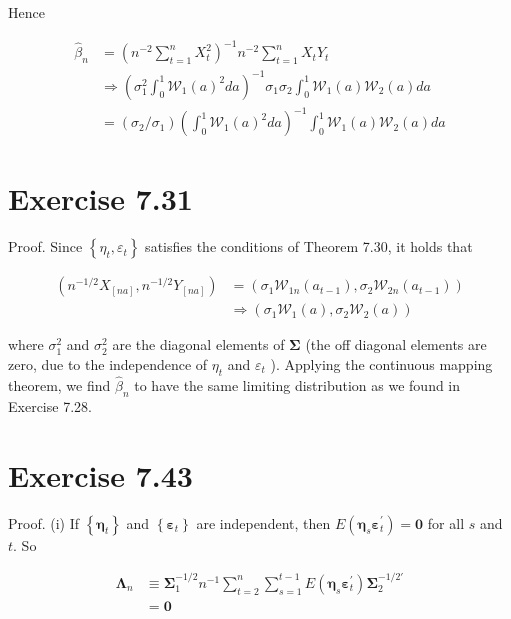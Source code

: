 \documentclass[10pt]{article}
\begin{document}
Hence

$$
\begin{aligned}
\hat{\beta}_{n} & =\left(n^{-2} \sum_{t=1}^{n} X_{t}^{2}\right)^{-1} n^{-2} \sum_{t=1}^{n} X_{t} Y_{t} \\
& \Rightarrow\left(\sigma_{1}^{2} \int_{0}^{1} \mathcal{W}_{1}(a)^{2} d a\right)^{-1} \sigma_{1} \sigma_{2} \int_{0}^{1} \mathcal{W}_{1}(a) \mathcal{W}_{2}(a) d a \\
& =\left(\sigma_{2} / \sigma_{1}\right)\left(\int_{0}^{1} \mathcal{W}_{1}(a)^{2} d a\right)^{-1} \int_{0}^{1} \mathcal{W}_{1}(a) \mathcal{W}_{2}(a) d a
\end{aligned}
$$

\section*{Exercise 7.31}
Proof. Since $\left\{\eta_{t}, \varepsilon_{t}\right\}$ satisfies the conditions of Theorem 7.30, it holds that

$$
\begin{aligned}
\left(n^{-1 / 2} X_{[n a]}, n^{-1 / 2} Y_{[n a]}\right) & =\left(\sigma_{1} \mathcal{W}_{1 n}\left(a_{t-1}\right), \sigma_{2} \mathcal{W}_{2 n}\left(a_{t-1}\right)\right) \\
& \Rightarrow\left(\sigma_{1} \mathcal{W}_{1}(a), \sigma_{2} \mathcal{W}_{2}(a)\right)
\end{aligned}
$$

where $\sigma_{1}^{2}$ and $\sigma_{2}^{2}$ are the diagonal elements of $\boldsymbol{\Sigma}$ (the off diagonal elements are zero, due to the independence of $\eta_{t}$ and $\varepsilon_{t}$ ). Applying the continuous mapping theorem, we find $\hat{\beta}_{n}$ to have the same limiting distribution as we found in Exercise 7.28.

\section*{Exercise 7.43}
Proof. (i) If $\left\{\boldsymbol{\eta}_{t}\right\}$ and $\left\{\boldsymbol{\varepsilon}_{t}\right\}$ are independent, then $E\left(\boldsymbol{\eta}_{s} \boldsymbol{\varepsilon}_{t}^{\prime}\right)=\mathbf{0}$ for all $s$ and $t$. So

$$
\begin{aligned}
\mathbf{\Lambda}_{n} & \equiv \mathbf{\Sigma}_{1}^{-1 / 2} n^{-1} \sum_{t=2}^{n} \sum_{s=1}^{t-1} E\left(\boldsymbol{\eta}_{s} \boldsymbol{\varepsilon}_{t}^{\prime}\right) \mathbf{\Sigma}_{2}^{-1 / 2 \prime} \\
& =\mathbf{0}
\end{aligned}
$$
\end{document}
